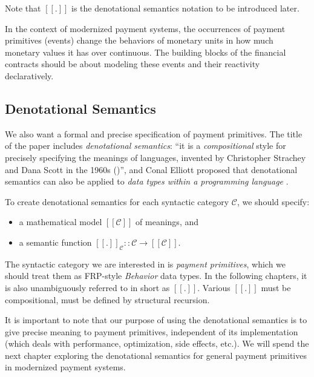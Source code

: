 Note that $[\![.]\!]$ is the denotational semantics notation to be introduced later.

In the context of modernized payment systems, the occurrences of payment primitives (events) change
the behaviors of monetary units in how much monetary values it has over continuous. The building
blocks of the financial contracts should be about modeling these events and their reactivity
declaratively.

\subsection{Denotational Semantics}

We also want a formal and precise specification of payment primitives. The title of the paper
includes \textit{denotational semantics}: ``it is a \textit{compositional} style for precisely
specifying the meanings of languages, invented by Christopher Strachey and Dana Scott in the 1960s
(\cite{scott1971toward})'', and Conal Elliott proposed that denotational semantics can also be
applied to \textit{data types within a programming language}
.

To create denotational semantics for each syntactic category $\mathcal{C}$, we should specify:

\begin{itemize}
\item a mathematical model $[\![\mathcal{C}]\!]$ of meanings, and
\item a semantic function $[\![.]\!]_{\mathcal{C}} :: \mathcal{C} \rightarrow [\![\mathcal{C}]\!]$.
\end{itemize}

The syntactic category we are interested in is \textit{payment primitives}, which we should treat
them as FRP-style \textit{Behavior} data types. In the following chapters, it is also unambiguously
referred to in short as $[\![.]\!]$. Various $[\![.]\!]$ must be compositional, \ie must be defined
by structural recursion.

It is important to note that our purpose of using the denotational semantics is to give precise
meaning to payment primitives, independent of its implementation (which deals with performance,
optimization, side effects, etc.). We will spend the next chapter exploring the denotational
semantics for general payment primitives in modernized payment systems.

